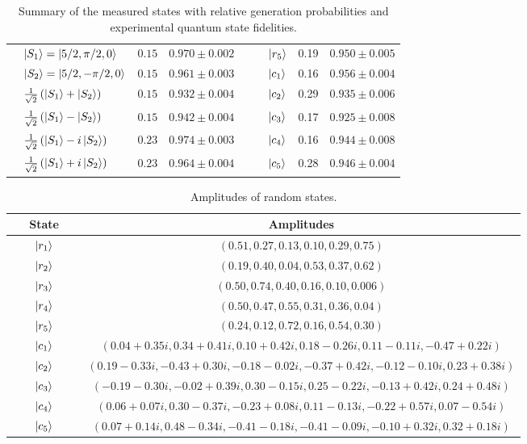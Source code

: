 \begin{table*}[h!]
\begin{tabular}{lcc|lcc}
 $\quad\ket{S_1}=\ket{5/2,\pi /2,0}$   & $0.15$ & $0.970 \pm 0.002\quad$ &$\quad\ket{r_5}$ & 0.19 & $0.950\pm0.005$  \\
 $\quad\ket{S_2}=\ket{5/2,-\pi /2,0}$ & $0.15$ & $0.961 \pm 0.003\quad$ &$\quad\ket{c_1}$ &0.16 & $0.956\pm0.004$ \\
 $\quad\frac{1}{\sqrt{2}}\left(\ket{S_1}+\ket{S_2}\right)$ & $0.15$ & $0.932 \pm 0.004\quad$&$\quad\ket{c_2}$ & 0.29 &$0.935 \pm 0.006$  \\
 $\quad\frac{1}{\sqrt{2}}\left(\ket{S_1}-\ket{S_2}\right)$ & $0.15$ & $0.942 \pm 0.004\quad$& $\quad\ket{c_3}$& 0.17 & $0.925\pm 0.008$ \\
$\quad\frac{1}{\sqrt{2}}\left(\ket{S_1}-i\ket{S_2}\right)$ & $0.23$ & $0.974 \pm 0.003\quad$&$\quad\ket{c_4}$ & 0.16 & $0.944\pm0.008$\\
$\quad\frac{1}{\sqrt{2}}\left(\ket{S_1}+i\ket{S_2}\right)$ & $0.23$ & $0.964 \pm 0.004\quad$& $\quad\ket{c_5}$ & 0.28 & $0.946\pm0.004$\\
\bottomrule
\end{tabular}
\caption{Summary of the measured states with relative generation probabilities and experimental quantum state fidelities. }
\label{table1}
\end{table*}

\begin{table*}[bh!]
\centering
\begin{tabular}{cc}
\toprule
State & Amplitudes \\
\midrule
$\qquad\ket{r_1}\qquad$& $\left( 0.51, 0.27, 0.13, 0.10, 0.29, 0.75\right)$\\
$\qquad\ket{r_2}\qquad$& $\left( 0.19, 0.40, 0.04, 0.53, 0.37, 0.62\right)$\\
$\qquad\ket{r_3}\qquad$&$\left( 0.50, 0.74, 0.40, 0.16, 0.10, 0.006\right)$ \\
$\qquad\ket{r_4}\qquad$& $\left( 0.50, 0.47, 0.55, 0.31, 0.36, 0.04\right)$ \\
$\qquad\ket{r_5}\qquad$& $\left( 0.24, 0.12, 0.72, 0.16, 0.54, 0.30\right)$ \\
$\qquad\ket{c_1}\qquad$& $\left( 0.04+0.35i, 0.34+0.41i, 0.10+0.42i, 0.18-0.26i, 0.11-0.11i, -0.47+0.22i\right)$  \\
$\qquad\ket{c_2}\qquad$& $\left( 0.19-0.33i, -0.43+0.30i, -0.18-0.02i, -0.37+0.42i, -0.12-0.10i, 0.23+0.38i\right)$\\
$\qquad\ket{c_3}\qquad$& $\left( -0.19-0.30i, -0.02+0.39i, 0.30-0.15i, 0.25-0.22i, -0.13+0.42i, 0.24+0.48i\right)$\\
$\qquad\ket{c_4}\qquad$& $\left( 0.06+0.07i, 0.30-0.37i, -0.23+0.08i, 0.11-0.13i, -0.22+0.57i, 0.07-0.54i\right)$\\
$\qquad\ket{c_5}\qquad$& $\left( 0.07+0.14i, 0.48-0.34i, -0.41-0.18i, -0.41-0.09i, -0.10+0.32i, 0.32+0.18i\right)$\\
\bottomrule
\end{tabular}
\caption{Amplitudes of random states.}
\label{table2}
\end{table*}

